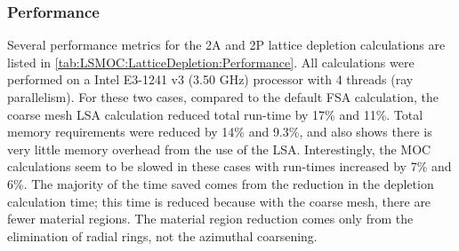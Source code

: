 {{{      \subsubsection{Performance}{\label{sssec:Performance}
        Several performance metrics for the 2A and 2P lattice depletion calculations are listed in \cref{tab:LSMOC:LatticeDepletion:Performance}.
        All calculations were performed on a Intel E3-1241 v3 (3.50 GHz) processor with 4 threads (ray parallelism).
        For these two cases, compared to the default \ac{FSA} calculation, the coarse mesh \ac{LSA} calculation reduced total run-time by 17\% and 11\%.
        Total memory requirements were reduced by 14\% and 9.3\%, and also shows there is very little memory overhead from the use of the \ac{LSA}.
        Interestingly, the \ac{MOC} calculations seem to be slowed in these cases with run-times increased by 7\% and 6\%.
        The majority of the time saved comes from the reduction in the depletion calculation time; this time is reduced because with the coarse mesh, there are fewer material regions.
        The material region reduction comes only from the elimination of radial rings, not the azimuthal coarsening.


}}}}
